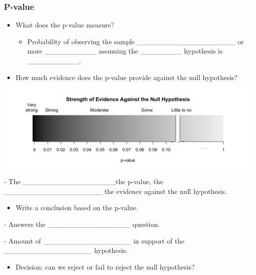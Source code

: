 \documentclass[
]{report}
\providecommand{\tightlist}{%
  \setlength{\itemsep}{0pt}\setlength{\parskip}{0pt}}
\newcommand{\rgi}{\hspace{24pt}}  %
\begin{document}
\subsubsection*{P-value}\label{p-value}


\begin{itemize}
\item
  What does the p-value measure?

  \begin{itemize}
  \tightlist
  \item
    Probability of observing the sample \_\_\_\_\_\_\_\_\_\_\_\_\_\_\_\_\_\_\_ or more \_\_\_\_\_\_\_\_\_\_
    assuming the \_\_\_\_\_\_\_\_ hypothesis is \_\_\_\_\_\_\_\_\_\_.
  \end{itemize}
\item
  How much evidence does the p-value provide against the null hypothesis?
\end{itemize}

\begin{center}\includegraphics[width=0.75\linewidth]{images/soe_gradient_gray} \end{center}

\rgi \rgi - The \_\_\_\_\_\_\_\_\_\_\_\_\_\_\_\_\_\_the p-value, the \_\_\_\_\_\_\_\_\_\_\_\_\_\_\_\_\_\_\_ the evidence against the null hypothesis.

\begin{itemize}
\tightlist
\item
  Write a conclusion based on the p-value.
\end{itemize}

\rgi \rgi - Answers the \_\_\_\_\_\_\_\_\_\_\_\_\_\_\_\_ question.

\rgi \rgi - Amount of \_\_\_\_\_\_\_\_\_\_\_\_\_\_\_\_\_ in support of the \_\_\_\_\_\_\_\_\_\_\_\_\_\_\_\_\_ hypothesis.

\begin{itemize}
\tightlist
\item
  Decision: can we reject or fail to reject the null hypothesis?
\end{itemize}
\end{document}
